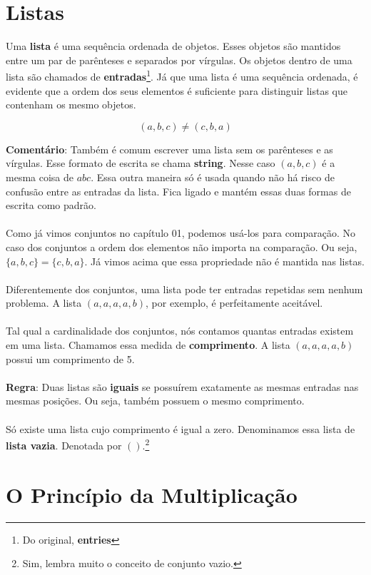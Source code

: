 \documentclass[a4paper,11pt]{book}
\theoremstyle{definition}
\theoremstyle{break}
\begin{document}
\section{Listas}

Uma \textbf{lista} é uma sequência ordenada de objetos. Esses objetos são mantidos entre um par de parênteses e separados por vírgulas. Os objetos dentro de uma lista são chamados de \textbf{entradas}\footnote{Do original, \textbf{entries}}. Já que uma lista é uma sequência ordenada, é evidente que a ordem dos seus elementos é suficiente para distinguir listas que contenham os mesmo objetos.

$$ (a,b,c) \neq (c,b,a) $$

\textbf{Comentário}: Também é comum escrever uma lista sem os parênteses e as vírgulas. Esse formato de escrita se chama \textbf{string}. Nesse caso $(a,b,c)$ é a mesma coisa de $abc$. Essa outra maneira só é usada quando não há risco de confusão entre as entradas da lista. Fica ligado e mantém essas duas formas de escrita como padrão.
\\
\\
Como já vimos conjuntos no capítulo 01, podemos usá-los para comparação. No caso dos conjuntos a ordem dos elementos não importa na comparação. Ou seja, $\{a,b,c\} = \{c,b,a\}$. Já vimos acima que essa propriedade não é mantida nas listas. 
\\
\\
Diferentemente dos conjuntos, uma lista pode ter entradas repetidas sem nenhum problema. A lista $(a,a,a,a,b)$, por exemplo, é perfeitamente aceitável.
\\
\\
Tal qual a cardinalidade dos conjuntos, nós contamos quantas entradas existem em uma lista. Chamamos essa medida de \textbf{comprimento}. A lista $(a,a,a,a,b)$ possui um comprimento de 5.
\\
\\
\textbf{Regra}: Duas listas são \textbf{iguais} se possuírem exatamente as mesmas entradas nas mesmas posições. Ou seja, também possuem o mesmo comprimento.
\\
\\
Só existe uma lista cujo comprimento é igual a zero. Denominamos essa lista de \textbf{lista vazia}. Denotada por $()$.\footnote{Sim, lembra muito o conceito de conjunto vazio.}

\section{O Princípio da Multiplicação}
\end{document}

